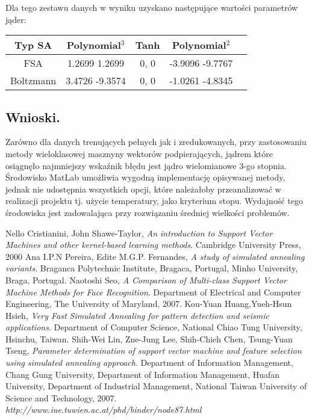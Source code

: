 \documentclass{article}
\begin{document}
Dla tego zestawu danych w wyniku uzyskano następujące wartości parametrów jąder:

\begin{center}
    \begin{tabular}{ | c | c | c | c | c | }
    \hline
    Typ SA & \textbf{Polynomial}$^{3}$ & \textbf{Tanh} & \textbf{Polynomial$^{2}$} \\ \hline
    FSA & 1.2699 1.2699 & 0, 0 & -3.9096 -9.7767 \\ \hline
	Boltzmann & 3.4726 -9.3574 & 0, 0 & -1.0261 -4.8345 \\ \hline
    \end{tabular}
\end{center}

\subsection{Wnioski.}
Zarówno dla danych trenujących pełnych jak i zredukowanych, przy zastosowaniu metody wieloklasowej 
masznyny wektorów podpierających, jądrem które osiągnęło najmniejszy wskaźnik błędu jest jądro wielomianowe
3-go stopnia.\linebreak
Środowisko MatLab umożliwia wygodną implementację opisywanej metody, jednak nie udostępnia wszystkich opcji, które
należałoby przeanalizować w realizacji projektu tj. użycie temperatury, jako kryterium stopu. Wydajność tego środowiska jest zadowalająca przy rozwiązaniu średniej wielkości problemów.

\pagebreak
\begin{thebibliography}{9}
Nello Cristianini, John Shawe-Taylor, \emph{An introduction to Support Vector Machines and other kernel-based learning methods}.
Cambridge University Press,
2000
Ana I.P.N Pereira, Edite M.G.P. Fernandes, \emph{A study of simulated annealing variants}.
Braganca Polytechnic Institute, Bragaca, Portugal,
Minho University, Braga, Portugal.
Naotoshi Seo, \emph{A Comparison of Multi-class Support Vector Machine Methods for Face Recognition}. 
Department of Electrical and Computer Engineering, The University of Maryland, 
2007.
Kou-Yuan Huang,Yueh-Hsun Hsieh, \emph{Very Fast Simulated Annealing for pattern detection and seismic applications}. Department of Computer Science, National Chiao Tung University, Hsinchu, Taiwan.
Shih-Wei Lin, Zne-Jung Lee, Shih-Chieh Chen, Tsung-Yuan Tseng, \emph{Parameter determination of support vector machine and feature selection using simulated annealing approach}. Department of Information Management, Chang Gung University, Department of Information Management, Huafan University, Department of Industrial Management, National Taiwan University of Science and Technology, 2007.
\emph{http://www.iue.tuwien.ac.at/phd/binder/node87.html}
\end{thebibliography}
\end{document}
